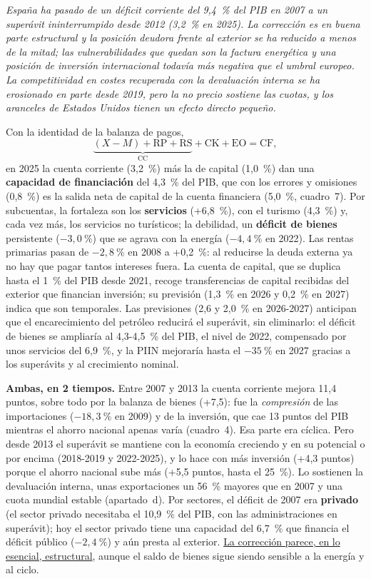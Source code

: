 \begin{examen}
\textit{España ha pasado de un déficit corriente del 9,4~\% del PIB en 2007 a un superávit ininterrumpido desde 2012 (3,2~\% en 2025). La corrección es en buena parte estructural y la posición deudora frente al exterior se ha reducido a menos de la mitad; las vulnerabilidades que quedan son la factura energética y una posición de inversión internacional todavía más negativa que el umbral europeo. La competitividad en costes recuperada con la devaluación interna se ha erosionado en parte desde 2019, pero la no precio sostiene las cuotas, y los aranceles de Estados Unidos tienen un efecto directo pequeño.}

Con la identidad de la balanza de pagos,
\[
\underbrace{(X-M)+\mathrm{RP}+\mathrm{RS}}_{\mathrm{CC}}+\mathrm{CK}+\mathrm{EO}=\mathrm{CF},
\]
en 2025 la cuenta corriente (3,2~\%) más la de capital (1,0~\%) dan una \textbf{capacidad de financiación} del 4,3~\% del PIB, que con los errores y omisiones (0,8~\%) es la salida neta de capital de la cuenta financiera (5,0~\%, cuadro~7). Por subcuentas, la fortaleza son los \textbf{servicios} (+6,8~\%), con el turismo (4,3~\%) y, cada vez más, los servicios no turísticos; la debilidad, un \textbf{déficit de bienes} persistente ($-3{,}0~\%$) que se agrava con la energía ($-4{,}4~\%$ en 2022). Las rentas primarias pasan de $-2{,}8~\%$ en 2008 a +0,2~\%: al reducirse la deuda externa ya no hay que pagar tantos intereses fuera. La cuenta de capital, que se duplica hasta el 1~\% del PIB desde 2021, recoge transferencias de capital recibidas del exterior que financian inversión; su previsión (1,3~\% en 2026 y 0,2~\% en 2027) indica que son temporales. Las previsiones (2,6 y 2,0~\% en 2026-2027) anticipan que el encarecimiento del petróleo reducirá el superávit, sin eliminarlo: el déficit de bienes se ampliaría al 4,3-4,5~\% del PIB, el nivel de 2022, compensado por unos servicios del 6,9~\%, y la PIIN mejoraría hasta el $-35~\%$ en 2027 gracias a los superávits y al crecimiento nominal.

\textbf{Ambas, en 2 tiempos.} Entre 2007 y 2013 la cuenta corriente mejora 11,4 puntos, sobre todo por la balanza de bienes (+7,5): fue la \emph{compresión} de las importaciones ($-18{,}3~\%$ en 2009) y de la inversión, que cae 13 puntos del PIB mientras el ahorro nacional apenas varía (cuadro~4). Esa parte era cíclica. Pero desde 2013 el superávit se mantiene con la economía creciendo y en su potencial o por encima (2018-2019 y 2022-2025), y lo hace con más inversión (+4,3 puntos) porque el ahorro nacional sube más (+5,5 puntos, hasta el 25~\%). Lo sostienen la devaluación interna, unas exportaciones un 56~\% mayores que en 2007 y una cuota mundial estable (apartado~d). Por sectores, el déficit de 2007 era \textbf{privado} (el sector privado necesitaba el 10,9~\% del PIB, con las administraciones en superávit); hoy el sector privado tiene una capacidad del 6,7~\% que financia el déficit público ($-2{,}4~\%$) y aún presta al exterior. \uline{La corrección parece, en lo esencial, estructural}, aunque el saldo de bienes sigue siendo sensible a la energía y al ciclo.


\end{examen}

